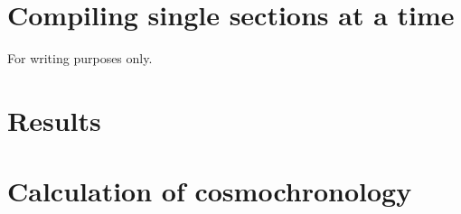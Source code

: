 \documentclass[a4paper, 12pt]{book}
\begin{document}
\chapter{Compiling single sections at a time}
For writing purposes only.

\iffalse

\chapter{Theory Part II \comment{(need to rename)}}
\comment{Describe analytical models, numerical models (omega), simulations (eris) and that I compare the two latter}
\comment{Results from omega can be compared to hydrodynamical simulations like eris. Which are much more detialed and precise, but also more computationally expensive.}
\setlength{\figwidth}{0.8\linewidth}



\fi

\iftrue

\chapter{Results}


\fi

\appendix
\chapter{Calculation of cosmochronology}



\end{document}
